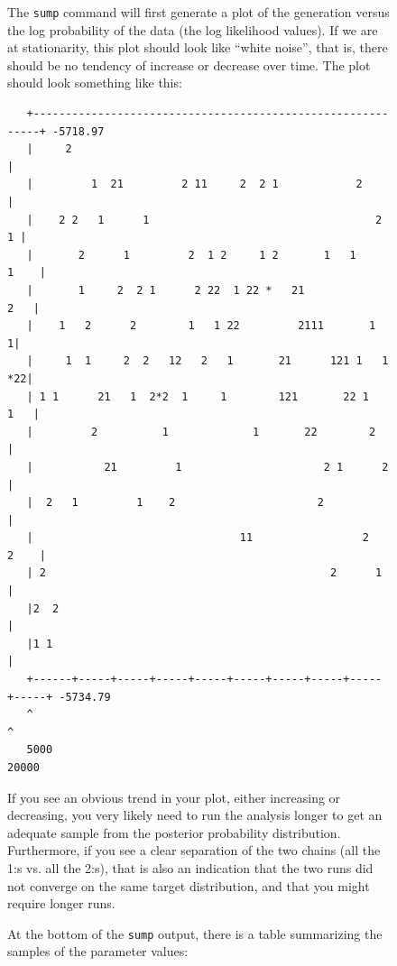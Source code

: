 \documentclass[12pt]{book}
\newcommand{\ttt}[1]{\texttt{#1}}
\begin{document}
\begin{figure}[h]
The \ttt{sump} command will first generate a plot of the generation versus the log probability of
the data (the log likelihood values). If we are at stationarity, this plot should look like ``white
noise'', that is, there should be no tendency of increase or decrease over time. The plot should
look something like this:

\begin{singlespacing}
\footnotesize
\begin{verbatim}
   +------------------------------------------------------------+ -5718.97
   |     2                                                      |
   |         1  21         2 11     2  2 1            2         |
   |    2 2   1      1                                   2    1 |
   |       2      1         2  1 2     1 2       1   1     1    |
   |       1     2  2 1      2 22  1 22 *   21              2   |
   |    1   2      2        1   1 22         2111       1      1|
   |     1  1     2  2   12   2   1       21      121 1   1  *22|
   | 1 1      21   1  2*2  1     1        121       22 1    1   |
   |         2          1             1       22        2       |
   |           21         1                      2 1      2     |
   |  2   1         1    2                      2               |
   |                                11                 2   2    |
   | 2                                            2      1      |
   |2  2                                                        |
   |1 1                                                         |
   +------+-----+-----+-----+-----+-----+-----+-----+-----+-----+ -5734.79
   ^                                                            ^
   5000                                                         20000

\end{verbatim}
\normalsize
\end{singlespacing}

If you see an obvious trend in your plot, either increasing or decreasing, you very likely need to
run the analysis longer to get an adequate sample from the posterior probability distribution.
Furthermore, if you see a clear separation of the two chains (all the 1:s vs. all the 2:s), that is
also an indication that the two runs did not converge on the same target distribution, and that you
might require longer runs.

At the bottom of the \ttt{sump} output, there is a table summarizing the samples of the parameter
values:


\end{figure}
\end{document}
